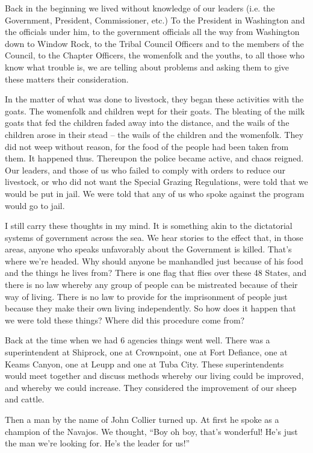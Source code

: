 Back in the beginning we lived without knowledge of our leaders (i.e. the Government, President, Commissioner, etc.) To the President in Washington and the officials under him, to the government officials all the way from Washington down to Window Rock, to the Tribal Council Officers and to the members of the Council, to the Chapter Officers, the womenfolk and the youths, to all those who know what trouble is, we are telling about problems and asking them to give these matters their consideration.

In the matter of what was done to livestock, they began these activities with the goats. The womenfolk and children wept for their goats. The bleating of the milk goats that fed the children faded away into the distance, and the wails of the children arose in their stead -- the wails of the children and the womenfolk. They did not weep without reason, for the food of the people had been taken from them. It happened thus. Thereupon the police became active, and chaos reigned. Our leaders, and those of us who failed to comply with orders to reduce our livestock, or who did not want the Special Grazing Regulations, were told that we would be put in jail. We were told that any of us who spoke against the program would go to jail.

I still carry these thoughts in my mind. It is something akin to the dictatorial systems of government across the sea. We hear stories to the effect that, in those areas, anyone who speaks unfavorably about the Government is killed. That's where we're headed. Why should anyone be manhandled just because of his food and the things he lives from? There is one flag that flies over these 48 States, and there is no law whereby any group of people can be mistreated because of their way of living. There is no law to provide for the imprisonment of people just because they make their own living independently. So how does it happen that we were told these things? Where did this procedure come from?

Back at the time when we had 6 agencies things went well. There was a superintendent at Shiprock, one at Crownpoint, one at Fort Defiance, one at Keams Canyon, one at Leupp and one at Tuba City. These superintendents would meet together and discuss methods whereby our living could be improved, and whereby we could increase. They considered the improvement of our sheep and cattle.

Then a man by the name of John Collier turned up. At first he spoke as a champion of the Navajos. We thought, ``Boy oh boy, that's wonderful! He's just the man we're looking for. He's the leader for us!''

